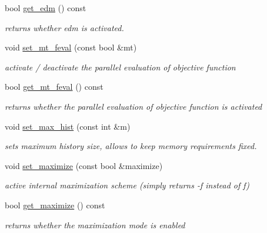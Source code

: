 \begin{DoxyCompactItemize}
bool \hyperlink{classlibcmaes_1_1Parameters_a3fa757be9e734622d77a831b3576aedb}{get\-\_\-edm} () const 
\begin{DoxyCompactList}\small\item\em returns whether edm is activated. \end{DoxyCompactList}\item 
void \hyperlink{classlibcmaes_1_1Parameters_a72995fb64587e6401d8b751343750c65}{set\-\_\-mt\-\_\-feval} (const bool \&mt)
\begin{DoxyCompactList}\small\item\em activate / deactivate the parallel evaluation of objective function \end{DoxyCompactList}\item 
bool \hyperlink{classlibcmaes_1_1Parameters_aac3914b24de6312e6d1fe3d493bb42f5}{get\-\_\-mt\-\_\-feval} () const 
\begin{DoxyCompactList}\small\item\em returns whether the parallel evaluation of objective function is activated \end{DoxyCompactList}\item 
void \hyperlink{classlibcmaes_1_1Parameters_a1226eeecac97019c183a9a85185efcc8}{set\-\_\-max\-\_\-hist} (const int \&m)
\begin{DoxyCompactList}\small\item\em sets maximum history size, allows to keep memory requirements fixed. \end{DoxyCompactList}\item 
void \hyperlink{classlibcmaes_1_1Parameters_a676f84fbe8726abf5ce88e117b159867}{set\-\_\-maximize} (const bool \&maximize)
\begin{DoxyCompactList}\small\item\em active internal maximization scheme (simply returns -\/f instead of f) \end{DoxyCompactList}\item 
bool \hyperlink{classlibcmaes_1_1Parameters_afec66b0ca5465b81498189e2cc8a14dc}{get\-\_\-maximize} () const 
\begin{DoxyCompactList}\small\item\em returns whether the maximization mode is enabled \end{DoxyCompactList}\end{DoxyCompactItemize}
